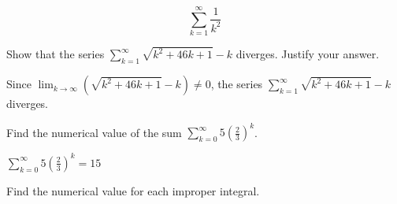 \documentclass[12pt,fleqn,answers]{exam}
\begin{document}
\begin{questions}
    \begin{solution}%
        \begin{equation*}
            \sum_{k=1}^\infty \frac{1}{k^2}
      \end{equation*}
    \end{solution}
    
    \question   Show that the series $\displaystyle \sum_{k=1}^\infty \sqrt{k^2 + 46 k+ 1} - k$
    diverges. Justify your answer.
    \begin{solution}[2.50in]
        Since $\displaystyle \lim_{k \to \infty} \left(\sqrt{k^2 + 46 k+ 1} - k \right) \neq 0$, 
        the  series $\displaystyle \sum_{k=1}^\infty \sqrt{k^2 + 46 k+ 1} - k$ diverges.
    \end{solution}
    
    \question   Find the numerical value of the sum 
    $\sum_{k=0}^\infty 5 \left(\frac{2}{3} \right)^k$.
    
    \begin{solution}%
        $\sum_{k=0}^\infty 5 \left(\frac{2}{3} \right)^k = 15$
    \end{solution}
    
    
    \question Find the numerical value for each improper integral.
    
    

\end{questions}
\end{document}
